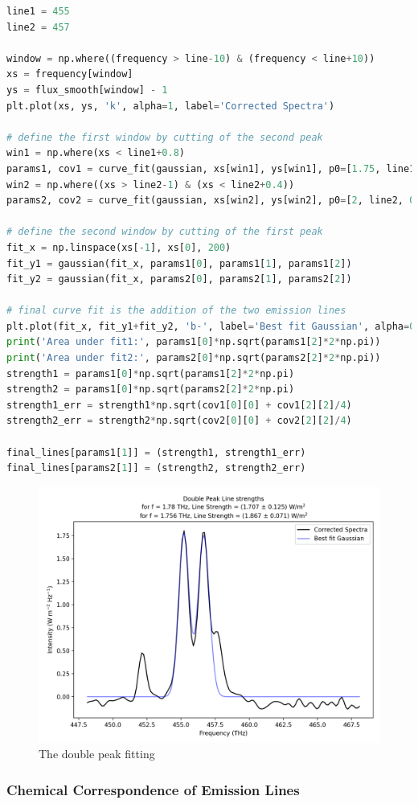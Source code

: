 \begin{lstlisting}[language=Python, caption=Dealing with double peaks]
line1 = 455
line2 = 457

window = np.where((frequency > line-10) & (frequency < line+10))
xs = frequency[window]
ys = flux_smooth[window] - 1
plt.plot(xs, ys, 'k', alpha=1, label='Corrected Spectra')

# define the first window by cutting of the second peak
win1 = np.where(xs < line1+0.8)
params1, cov1 = curve_fit(gaussian, xs[win1], ys[win1], p0=[1.75, line1, 0.1])
win2 = np.where((xs > line2-1) & (xs < line2+0.4))
params2, cov2 = curve_fit(gaussian, xs[win2], ys[win2], p0=[2, line2, 0.5])

# define the second window by cutting of the first peak
fit_x = np.linspace(xs[-1], xs[0], 200)
fit_y1 = gaussian(fit_x, params1[0], params1[1], params1[2]) 
fit_y2 = gaussian(fit_x, params2[0], params2[1], params2[2]) 

# final curve fit is the addition of the two emission lines
plt.plot(fit_x, fit_y1+fit_y2, 'b-', label='Best fit Gaussian', alpha=0.5) 
print('Area under fit1:', params1[0]*np.sqrt(params1[2]*2*np.pi))
print('Area under fit2:', params2[0]*np.sqrt(params2[2]*2*np.pi))
strength1 = params1[0]*np.sqrt(params1[2]*2*np.pi)
strength2 = params1[0]*np.sqrt(params2[2]*2*np.pi)
strength1_err = strength1*np.sqrt(cov1[0][0] + cov1[2][2]/4)
strength2_err = strength2*np.sqrt(cov2[0][0] + cov2[2][2]/4)

final_lines[params1[1]] = (strength1, strength1_err)
final_lines[params2[1]] = (strength2, strength2_err)
\end{lstlisting}

\begin{figure}[H]
    \centering
    \includegraphics[width=0.6\linewidth]{Figures/3/double_peak.png}
    \caption{The double peak fitting}
\end{figure}

\subsubsection{Chemical Correspondence of Emission Lines}

